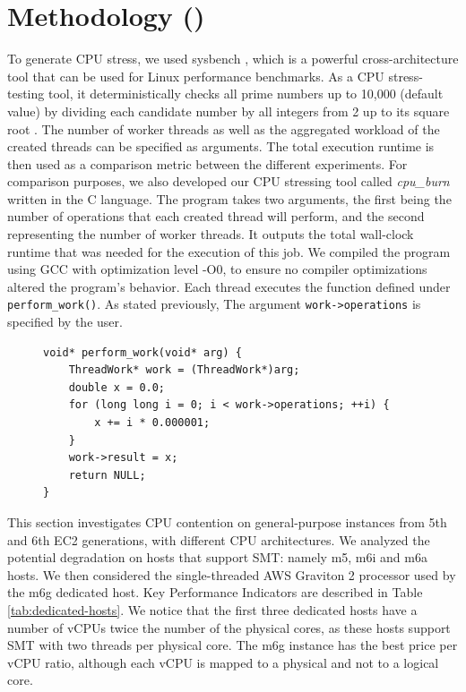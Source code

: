 \section{Methodology (\checkmark)}
To generate CPU stress, we used sysbench \cite{sysbench}, which is a powerful cross-architecture tool
that can be used for Linux performance benchmarks. As a CPU stress-testing tool, it deterministically 
checks all prime numbers up to 10,000 (default value) by dividing each candidate number by all integers 
from 2 up to its square root \cite{gentoo_sysbench}. The number of worker threads 
as well as the aggregated workload of the created threads can be specified as arguments. 
The total execution runtime is then used as a comparison metric 
between the different experiments. For comparison purposes, we also developed our CPU stressing 
tool called \textit{cpu\_burn} written in the C language. The program takes two arguments, the first 
being the number of operations that each created thread will perform, and the second representing 
the number of worker threads. It outputs the total wall-clock runtime that was needed for the 
execution of this job. 
We compiled the program using GCC with optimization level -O0, to ensure no compiler optimizations
altered the program's behavior. Each thread executes the function defined under \texttt{perform\_work()}. 
As stated previously, The argument \texttt{work->operations} is specified by the user.

\begin{figure}[H]
\begin{lstlisting}[caption={Workload of the \textit{cpu\_burn} tool}]
void* perform_work(void* arg) {
    ThreadWork* work = (ThreadWork*)arg;
    double x = 0.0;
    for (long long i = 0; i < work->operations; ++i) {
        x += i * 0.000001;
    }
    work->result = x;
    return NULL;
}
\end{lstlisting}
\end{figure}
\noindent
This section investigates CPU contention on general-purpose instances from 5th and 6th EC2 generations, 
with different CPU architectures. We analyzed the potential degradation on hosts that support 
\acl{SMT}: namely m5, m6i and m6a hosts. We then considered the single-threaded AWS Graviton 2 
processor used by the m6g dedicated host. Key Performance Indicators are described 
in Table \ref{tab:dedicated-hosts}. We notice that the first three dedicated hosts have a number of vCPUs 
twice the number of the physical cores, as these hosts support \ac{SMT} with 
two threads per physical core. The m6g instance has the best price per vCPU ratio, although each 
vCPU is mapped to a physical and not to a logical core.

